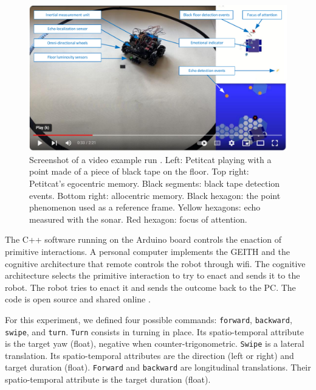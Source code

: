 \documentclass[runningheads]{llncs}
\begin{document}
\begin{figure}
	\includegraphics[width=\textwidth]{Figure_video.pdf}
	\caption{Screenshot of a video example run \cite{georgeon_petitcat_2024}.
		Left: Petitcat playing with a point made of a piece of black tape on the floor.
		Top right: Petitcat's egocentric memory. Black segments: black tape detection events. 
		Bottom right: allocentric memory. Black hexagon: the point phenomenon used as a reference frame. Yellow hexagons: echo measured with the sonar. Red hexagon: focus of attention.} \label{fig:video}
\end{figure}

The C++ software running on the Arduino board controls the enaction of primitive interactions. 
A personal computer implements the GEITH and the cognitive architecture that remote controls the robot through wifi.
The cognitive architecture selects the primitive interaction to try to enact and sends it to the robot. 
The robot tries to enact it and sends the outcome back to the PC.  
The code is open source and shared online \cite{petitcat_github}.

For this experiment, we defined four possible commands: \texttt{forward}, \texttt{backward}, \texttt{swipe}, and \texttt{turn}. 
\texttt{Turn} consists in turning in place. Its spatio-temporal attribute is the target yaw (float), negative when counter-trigonometric. 
\texttt{Swipe} is a lateral translation. Its spatio-temporal attributes are the direction (left or right) and target duration (float). 
\texttt{Forward} and \texttt{backward} are longitudinal translations. Their spatio-temporal attribute is the target duration (float).   
\end{document}
